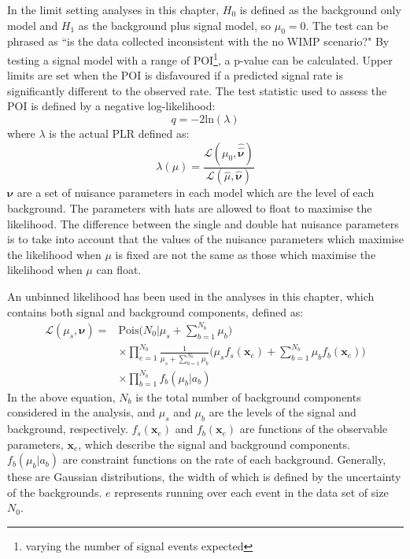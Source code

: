 \par
In the limit setting analyses in this chapter, $H_0$ is defined as the background only model and $H_1$ as the background plus signal model, so $\mu_0=0$.
The test can be phrased as ``is the data collected inconsistent with the no WIMP scenario?"
By testing a signal model with a range of POI\footnote{varying the number of signal events expected}, a p-value can be calculated. 
Upper limits are set when the POI is disfavoured if a predicted signal rate is significantly different to the observed rate.
The test statistic used to assess the POI is defined by a negative log-likelihood:
\begin{equation}
    q = -2 \text{ln}(\lambda)
\end{equation}
where $\lambda$ is the actual PLR defined as:
\begin{equation}
    \lambda(\mu) = \frac{\mathcal{L}(\mu_0, \boldsymbol{\hat{\hat{\nu}}})}{\mathcal{L}(\hat{\mu}, \boldsymbol{\hat{\nu}})}
\end{equation}
$\boldsymbol{\nu}$ are a set of nuisance parameters in each model which are the level of each background.
The parameters with hats are allowed to float to maximise the likelihood.
The difference between the single and double hat nuisance parameters is to take into account that the values of the nuisance parameters which maximise the likelihood when $\mu$ is fixed are not the same as those which maximise the likelihood when $\mu$ can float.
\par
An unbinned likelihood has been used in the analyses in this chapter, which contains both signal and background components, defined as:
\begin{equation}
\begin{split}
    \mathcal{L}(\mu_s,\boldsymbol{\nu}) =& \text{Pois} \bigg(N_0 | \mu_s + \sum^{N_b}_{b=1} \mu_b \bigg) \\
                                         & \times \prod^{N_0}_{e=1} \frac{1}{\mu_s + \sum^{N_b}_{b=1} \mu_b} \bigg( \mu_s f_s (\boldsymbol{x}_e) + \sum^{N_b}_{b=1} \mu_b f_b(\boldsymbol{x}_e) \bigg) \\
                                         & \times \prod^{N_b}_{b=1} f_b(\mu_b | a_b)
\end{split}
\end{equation}
In the above equation, $N_b$ is the total number of background components considered in the analysis, and $\mu_s$ and $\mu_b$ are the levels of the signal and background, respectively. 
$f_s(\boldsymbol{x}_e)$ and $f_b(\boldsymbol{x}_e)$ are functions of the observable parameters,  $\boldsymbol{x}_e$, which describe the signal and background components.
$f_b(\mu_b | a_b)$ are constraint functions on the rate of each background.
Generally, these are Gaussian distributions, the width of which is defined by the uncertainty of the backgrounds.
$e$ represents running over each event in the data set of size $N_0$.

